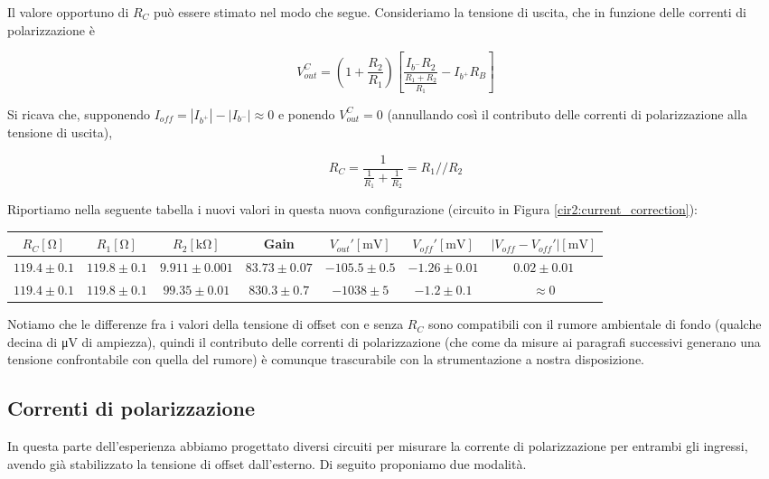 Il valore opportuno di $R_C$ può essere stimato nel modo che segue. Consideriamo la tensione di uscita, che in funzione delle correnti di polarizzazione è

\begin{equation}
V_{out}^{C} = \left( 1+\frac{R_2}{R_1} \right)\left[ \frac{I_{b^-}R_2}{\frac{R_1+R_2}{R_1}} - I_{b^+} R_B\right]
\label{eq2:Vout_currents}
\end{equation}

Si ricava che, supponendo $I_{off} = |I_{b^+}|-|I_{b^-}| \approx 0$ e ponendo $V_{out}^{C}=0$ (annullando così il contributo delle correnti di polarizzazione alla tensione di uscita),

$$R_C=\frac{1}{\frac{1}{R_1} + \frac{1}{R_2}} = R_1 // R_2$$

Riportiamo nella seguente tabella i nuovi valori in questa nuova configurazione (circuito in Figura \ref{cir2:current_correction}):

\begin{center}
\begin{tabular}{c|c|c|c|c|c|c}
$R_C [\si{\ohm}]$& $R_1[\si{\ohm}]$ & $R_2[\si{\kilo\ohm}]$ & Gain & $V_{out}' [\si{\milli\volt}]$ & $V_{off}' [\si{\milli\volt}]$ & $|V_{off}-V_{off}'|[\si{\milli\volt}]$ \\ 
\hline 
$119.4\pm0.1$ & $119.8\pm0.1$ & $9.911\pm0.001$  & $83.73 \pm 0.07$ & $-105.5 \pm 0.5$ & $-1.26 \pm0.01$ & $0.02\pm0.01$ \\
\hline
$119.4\pm0.1$ & $119.8\pm0.1$ & $99.35\pm0.01$  & $830.3\pm0.7$ &$ -1038 \pm 5$ & $-1.2 \pm 0.1$ & $\approx 0$\\
\end{tabular}
\end{center}

Notiamo che le differenze fra i valori della tensione di offset con e senza $R_C$ sono compatibili con il rumore ambientale di fondo (qualche decina di \si{\micro\volt} di ampiezza), quindi il contributo delle correnti di polarizzazione (che come da misure ai paragrafi successivi generano una tensione confrontabile con quella del rumore) è comunque trascurabile con la strumentazione a nostra disposizione.

\newpage

\subsection{Correnti di polarizzazione}

In questa parte dell'esperienza abbiamo progettato diversi circuiti per misurare la corrente di polarizzazione per entrambi gli ingressi, avendo già stabilizzato la tensione di offset dall'esterno. Di seguito proponiamo due modalità.

